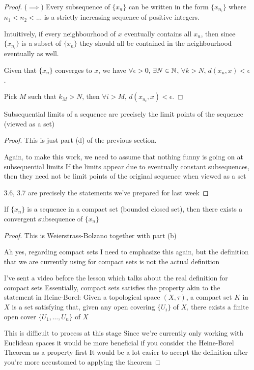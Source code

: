 \begin{proof}
($\implies$) Every subsequence of $\{x_n\}$ can be written in the form $\{x_{n_i}\}$ where $n_1<n_2<\dots$ is a strictly increasing sequence of positive integers.

Intuitively, if every neighbourhood of $x$ eventually contains all $x_n$, then since $\{x_{n_i}\}$ is a subset of $\{x_n\}$ they should all be contained in the neighbourhood eventually as well.

Given that $\{x_n\}$ converges to $x$, we have $\forall\epsilon>0$, $\exists N\in\mathbb N$, $\forall k>N$, $d(x_n,x)<\epsilon$.

Pick $M$ such that $k_M>N$, then $\forall i>M$, $d(x_{n_i},x)<\epsilon$.
\end{proof}

\begin{proposition}
Subsequential limits of a sequence are precisely the limit points of the sequence (viewed as a set)
\end{proposition}

\begin{proof}
This is just part (d) of the previous section.

Again, to make this work, we need to assume that nothing funny is going on at subsequential limits
If the limits appear due to eventually constant subsequences, then they need not be limit points of the original sequence when viewed as a set

3.6, 3.7 are precisely the statements we've prepared for last week
\end{proof}

\begin{proposition}
If $\{x_n\}$ is a sequence in a compact set (bounded closed set), then there exists a convergent subsequence of $\{x_n\}$
\end{proposition}

\begin{proof}
This is Weierstrass-Bolzano together with part (b)

Ah yes, regarding compact sets
I need to emphasize this again, but the definition that we are currently using for compact sets is not the actual definition

I've sent a video before the lesson which talks about the real definition for compact sets %
Essentially, compact sets satisfies the property akin to the statement in Heine-Borel:
Given a topological space $(X,\tau)$, a compact set $K$ in $X$ is a set satisfying that, given any open covering $\{U_i\}$ of $X$, there exists a finite open cover $\{U_1,\dots,U_n\}$ of $X$

This is difficult to process at this stage
Since we're currently only working with Euclidean spaces it would be more beneficial if you consider the Heine-Borel Theorem as a property first
It would be a lot easier to accept the definition after you're more accustomed to applying the theorem
\end{proof}

